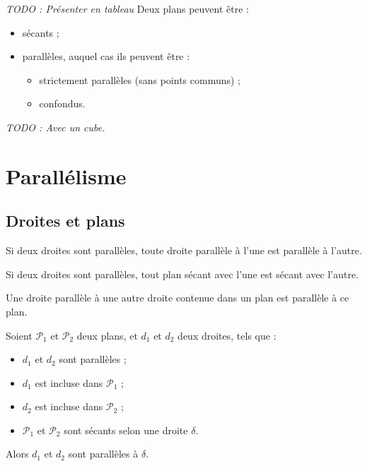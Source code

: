 \begin{propriete}
  \emph{TODO : Présenter en tableau}
  Deux plans peuvent être :
  \begin{itemize}
    \item sécants ;
    \item parallèles, auquel cas ils peuvent être :
      \begin{itemize}
        \item strictement parallèles (sans points communs) ;
        \item confondus.
      \end{itemize}
  \end{itemize}
\end{propriete}

\begin{exemple}
  \emph{TODO : Avec un cube.}
\end{exemple}
\section{Parallélisme}

\subsection{Droites et plans}

\begin{propriete}
  Si deux droites sont parallèles, toute droite parallèle à l'une est parallèle à l'autre.
\end{propriete}

\begin{propriete}
  Si deux droites sont parallèles, tout plan sécant avec l'une est sécant avec l'autre.
\end{propriete}

\begin{propriete}
  Une droite parallèle à une autre droite contenue dans un plan est parallèle à ce plan.
\end{propriete}

\begin{theoreme}
  Soient $\mathcal{P}_1$ et $\mathcal{P}_2$ deux plans, et $d_1$ et $d_2$ deux droites, tels que :
  \begin{itemize}
    \item $d_1$ et $d_2$ sont parallèles ;
    \item $d_1$ est incluse dans $\mathcal{P}_1$ ;
    \item $d_2$ est incluse dans $\mathcal{P}_2$ ;
    \item $\mathcal{P}_1$ et $\mathcal{P}_2$ sont sécants selon une droite $\delta$.
  \end{itemize}
  Alors $d_1$ et $d_2$ sont parallèles à $\delta$.

\end{theoreme}


